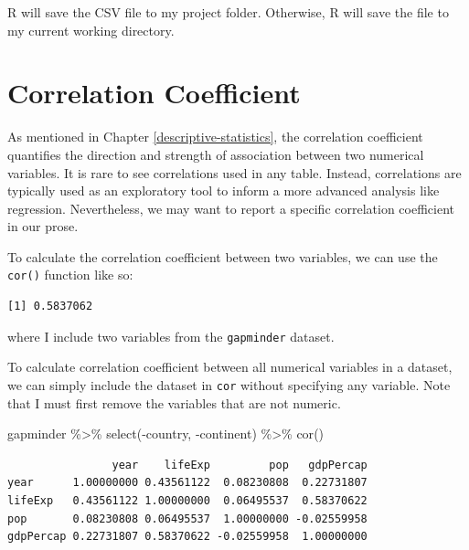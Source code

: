\documentclass[
]{book}
\makeatletter
\newenvironment{Shaded}{\begin{snugshade}}{\end{snugshade}}
\newcommand{\FunctionTok}[1]{\textcolor[rgb]{0,0,0}{#1}}
\newcommand{\NormalTok}[1]{#1}
\newcommand{\SpecialCharTok}[1]{\textcolor[rgb]{0,0,0}{#1}}
\newenvironment{kframe}{%
\medskip{}
\setlength{\fboxsep}{.8em}
 \def\at@end@of@kframe{}%
 \ifinner\ifhmode%
  \def\at@end@of@kframe{\end{minipage}}%
  \begin{minipage}{\columnwidth}%
 \fi\fi%
 \def\FrameCommand##1{\hskip\@totalleftmargin \hskip-\fboxsep
 \colorbox{shadecolor}{##1}\hskip-\fboxsep
     \hskip-\linewidth \hskip-\@totalleftmargin \hskip\columnwidth}%
 \MakeFramed {\advance\hsize-\width
   \@totalleftmargin\z@ \linewidth\hsize
   \@setminipage}}%
 {\par\unskip\endMakeFramed%
 \at@end@of@kframe}
\renewenvironment{Shaded}{\begin{kframe}}{\end{kframe}}
\makeatother
\begin{document}
R will save the CSV file to my project folder. Otherwise, R will save the file to my current working directory.

\hypertarget{correlation-coefficient}{%
\section{Correlation Coefficient}\label{correlation-coefficient}}

As mentioned in Chapter \ref{descriptive-statistics}, the correlation coefficient quantifies the direction and strength of association between two numerical variables. It is rare to see correlations used in any table. Instead, correlations are typically used as an exploratory tool to inform a more advanced analysis like regression. Nevertheless, we may want to report a specific correlation coefficient in our prose.

To calculate the correlation coefficient between two variables, we can use the \texttt{cor()} function like so:

\begin{Shaded}
\end{Shaded}

\begin{verbatim}
[1] 0.5837062
\end{verbatim}

where I include two variables from the \texttt{gapminder} dataset.

To calculate correlation coefficient between all numerical variables in a dataset, we can simply include the dataset in \texttt{cor} without specifying any variable. Note that I must first remove the variables that are not numeric.

\begin{Shaded}
\begin{Highlighting}[]
\NormalTok{gapminder }\SpecialCharTok{\%\textgreater{}\%} 
  \FunctionTok{select}\NormalTok{(}\SpecialCharTok{{-}}\NormalTok{country, }\SpecialCharTok{{-}}\NormalTok{continent) }\SpecialCharTok{\%\textgreater{}\%} 
  \FunctionTok{cor}\NormalTok{()}
\end{Highlighting}
\end{Shaded}

\begin{verbatim}
                year    lifeExp         pop   gdpPercap
year      1.00000000 0.43561122  0.08230808  0.22731807
lifeExp   0.43561122 1.00000000  0.06495537  0.58370622
pop       0.08230808 0.06495537  1.00000000 -0.02559958
gdpPercap 0.22731807 0.58370622 -0.02559958  1.00000000
\end{verbatim}
\end{document}
